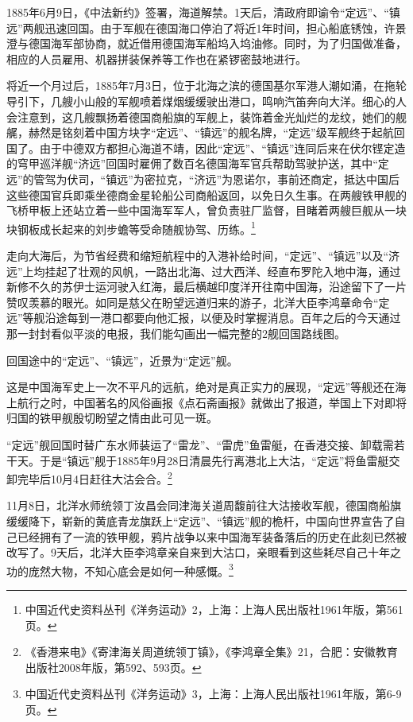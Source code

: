 \documentclass[12pt,UTF8]{ctexbook}
\begin{document}
1885年6月9日，《中法新约》签署，海道解禁。1天后，清政府即谕令“定远”、“镇远”两舰迅速回国。由于军舰在德国海口停泊了将近1年时间，担心船底锈蚀，许景澄与德国海军部协商，就近借用德国海军船坞入坞油修。同时，为了归国做准备，相应的人员雇用、机器拼装保养等工作也在紧锣密鼓地进行。

将近一个月过后，1885年7月3日，位于北海之滨的德国基尔军港人潮如涌，在拖轮导引下，几艘小山般的军舰喷着煤烟缓缓驶出港口，鸣响汽笛奔向大洋。细心的人会注意到，这几艘飘扬着德国商船旗的军舰上，装饰着金光灿烂的龙纹，她们的舰艉，赫然是铭刻着中国方块字“定远”、“镇远”的舰名牌，“定远”级军舰终于起航回国了。由于中德双方都担心海道不靖，因此“定远”、“镇远”连同后来在伏尔铿定造的穹甲巡洋舰“济远”回国时雇佣了数百名德国海军官兵帮助驾驶护送，其中“定远”的管驾为伏司，“镇远”为密拉克，“济远”为恩诺尔，事前还商定，抵达中国后这些德国官兵即乘坐德商金星轮船公司商船返回，以免日久生事。在两艘铁甲舰的飞桥甲板上还站立着一些中国海军军人，曾负责驻厂监督，目睹着两艘巨舰从一块块钢板成长起来的刘步蟾等受命随舰协驾、历练。\footnote{中国近代史资料丛刊《洋务运动》2，上海：上海人民出版社1961年版，第561页。}

走向大海后，为节省经费和缩短航程中的入港补给时间，“定远”、“镇远”以及“济远”上均挂起了壮观的风帆，一路出北海、过大西洋、经直布罗陀入地中海，通过新修不久的苏伊士运河驶入红海，最后横越印度洋开往南中国海，沿途留下了一片赞叹羡慕的眼光。如同是慈父在盼望远道归来的游子，北洋大臣李鸿章命令“定远”等舰沿途每到一港口都要向他汇报，以便及时掌握消息。百年之后的今天通过那一封封看似平淡的电报，我们能勾画出一幅完整的2舰回国路线图。

回国途中的“定远”、“镇远”，近景为“定远”舰。

这是中国海军史上一次不平凡的远航，绝对是真正实力的展现，“定远”等舰还在海上航行之时，中国著名的风俗画报《点石斋画报》就做出了报道，举国上下对即将归国的铁甲舰殷切盼望之情由此可见一斑。

“定远”舰回国时替广东水师装运了“雷龙”、“雷虎”鱼雷艇，在香港交接、卸载需若干天。于是“镇远”舰于1885年9月28日清晨先行离港北上大沽，“定远”将鱼雷艇交卸完毕后10月4日赶往大沽会合。\footnote{《香港来电》《寄津海关周道统领丁镇》，《李鸿章全集》21，合肥：安徽教育出版社2008年版，第592、593页。}

11月8日，北洋水师统领丁汝昌会同津海关道周馥前往大沽接收军舰，德国商船旗缓缓降下，崭新的黄底青龙旗跃上“定远”、“镇远”舰的桅杆，中国向世界宣告了自己已经拥有了一流的铁甲舰，鸦片战争以来中国海军装备落后的历史在此刻已然被改写了。9天后，北洋大臣李鸿章亲自来到大沽口，亲眼看到这些耗尽自己十年之功的庞然大物，不知心底会是如何一种感慨。\footnote{中国近代史资料丛刊《洋务运动》3，上海：上海人民出版社1961年版，第6-9页。}
\end{document}
